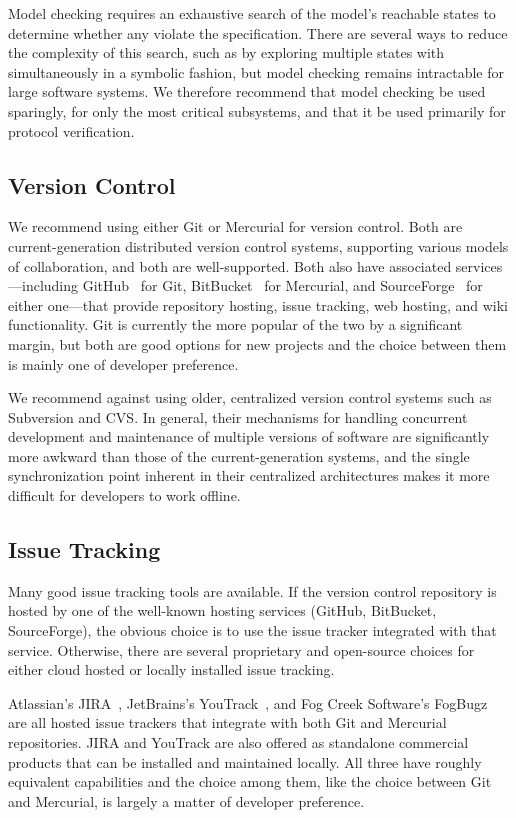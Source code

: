 Model checking requires an exhaustive search of the model's reachable
states to determine whether any violate the specification. There are
several ways to reduce the complexity of this search, such as by
exploring multiple states with simultaneously in a symbolic fashion,
but model checking remains intractable for large software systems. We
therefore recommend that model checking be used sparingly, for only
the most critical subsystems, and that it be used primarily for
protocol verification.

\subsection{Version Control}

We recommend using either Git or Mercurial for version control. Both
are current-generation distributed version control systems, supporting
various models of collaboration, and both are well-supported. Both
also have associated services---including GitHub~\cite{GitHub} for
Git, BitBucket~\cite{BitBucket} for Mercurial, and
SourceForge~\cite{SourceForge} for either one---that provide
repository hosting, issue tracking, web hosting, and wiki
functionality. Git is currently the more popular of the two by a
significant margin, but both are good options for new projects and the
choice between them is mainly one of developer preference.

We recommend against using older, centralized version control systems
such as Subversion and CVS. In general, their mechanisms for handling
concurrent development and maintenance of multiple versions of
software are significantly more awkward than those of the
current-generation systems, and the single synchronization point
inherent in their centralized architectures makes it more difficult
for developers to work offline.

\subsection{Issue Tracking}

Many good issue tracking tools are available. If the version control
repository is hosted by one of the well-known hosting services
(GitHub, BitBucket, SourceForge), the obvious choice is to use the
issue tracker integrated with that service. Otherwise, there are
several proprietary and open-source choices for either cloud hosted or
locally installed issue tracking.

Atlassian's JIRA~\cite{JIRA}, JetBrains's YouTrack~\cite{YouTrack},
and Fog Creek Software's FogBugz~\cite{FogBugz} are all hosted issue
trackers that integrate with both Git and Mercurial repositories. JIRA
and YouTrack are also offered as standalone commercial products that
can be installed and maintained locally. All three have roughly
equivalent capabilities and the choice among them, like the choice
between Git and Mercurial, is largely a matter of developer
preference.

